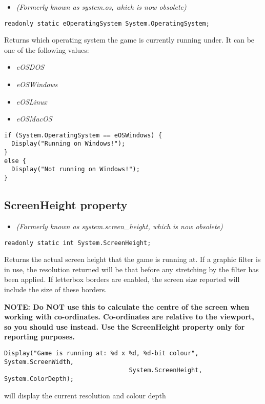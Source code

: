 \begin{itemize}
\item \it{(Formerly known as system.os, which is now obsolete)}
\end{itemize}

\begin{verbatim}
readonly static eOperatingSystem System.OperatingSystem;
\end{verbatim}
Returns which operating system the game is currently running under. It can be one of
the following values:
\begin{itemize}
\item \it{eOSDOS}
\item \it{eOSWindows}
\item \it{eOSLinux}
\item \it{eOSMacOS}
\end{itemize}

\begin{verbatim}
if (System.OperatingSystem == eOSWindows) {
  Display("Running on Windows!");
}
else {
  Display("Not running on Windows!");
}
\end{verbatim}


\subsection{ScreenHeight property}\label{System.ScreenHeight}%

\begin{itemize}
\item \it{(Formerly known as system.screen_height, which is now obsolete)}
\end{itemize}

\begin{verbatim}
readonly static int System.ScreenHeight;
\end{verbatim}
Returns the actual screen height that the game is running at.  If a graphic filter is in
use, the resolution returned will be that before any stretching by the filter has been
applied. If letterbox borders are enabled, the screen size reported will include the size
of these borders.

\bf{NOTE:} Do \bf{NOT} use this to calculate the centre of the screen when working
with co-ordinates. Co-ordinates are relative to the viewport, so you should
use  instead. Use the ScreenHeight
property only for reporting purposes.

\begin{verbatim}
Display("Game is running at: %d x %d, %d-bit colour", System.ScreenWidth,
                                  System.ScreenHeight, System.ColorDepth);
\end{verbatim}
will display the current resolution and colour depth

